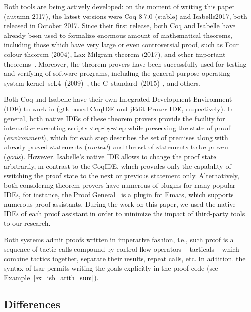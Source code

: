 \documentclass[article]{aaltoseries}
\begin{document}
Both tools are being actively developed: on the moment of writing this paper (autumn 2017), the latest versions were Coq 8.7.0 (stable) and Isabelle2017, both released in October 2017. Since their first release, both Coq and Isabelle have already been used to formalize enormous amount of mathematical theorems, including those which have very large or even controversial proof, such as Four colour theorem (2004), Lax-Milgram theorem (2017), and other important theorems~\cite{Wiedijk100}. Moreover, the theorem provers have been successfully used for testing and verifying of software programs, including the general-purpose operating system kernel~seL4~(2009)~\cite{Klein09}, the C~standard~(2015)~\cite{Krebbers15}, and others.

Both Coq and Isabelle have their own Integrated Development Environment (IDE) to work in (gtk-based CoqIDE and jEdit Prover IDE, respectively). In general, both native IDEs of these theorem provers provide the facility for interactive executing scripts step-by-step while preserving the state of proof (\textit{environment}), which for each step describes the set of premises along with already proved statements (\textit{context}) and the set of statements to be proven (\textit{goals}). However, Isabelle's native IDE allows to change the proof state arbitrarily, in contrast to the CoqIDE, which provides only the capability of switching the proof state to the next or previous statement only. Alternatively, both considering theorem provers have numerous of plugins for many popular IDEs, for instance, the Proof General~\cite{tool_PG} is a plugin for Emacs, which supports numerous proof assistants. During the work on this paper, we used the native IDEs of each proof assistant in order to minimize the impact of third-party tools to our research.

Both systems admit proofs written in imperative fashion, i.e., such proof is a sequence of tactic calls compound by control-flow operators -- tacticals -- which combine tactics together, separate their results, repeat calls, etc. In addition, the syntax of Isar permits writing the goals explicitly in the proof code (see Example~\ref{ex_isb_arith_sum}).


\subsection{Differences}
\end{document}
